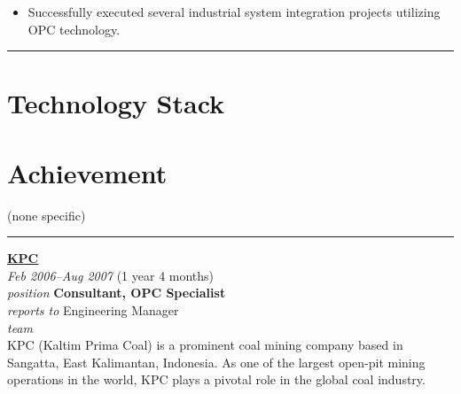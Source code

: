 \documentclass[12pt]{res}
\begin{document}
\begin{resume}
\begin{multicols}{2}
\begin{itemize}
\item Successfully executed several industrial system integration projects utilizing OPC technology.
		\end{itemize}
\end{multicols}

\vspace{-20pt}
\begin{minipage}[t]{0.55\linewidth}
	\rule{0.25\textwidth}{2pt}
	\begin{multicols}{2}
		\section{Technology Stack}
		\columnbreak
		\section{}
	\end{multicols}
	\vspace{1pt}
\end{minipage}
\hfill
\begin{minipage}[t]{0.42\linewidth}
	\vspace{18pt}
	\section{Achievement}
	\begin{flushleft}
        \begin{itemize}
		\footnotesize{(none specific)}
        \end{itemize}
	\end{flushleft}
\end{minipage}

\vspace{10pt}
\rule{1.0\textwidth}{0.1pt}

\begin{multicols}{2}
	{\large {\bf \href{https://kpc.co.id}{KPC}}} \\
	{\footnotesize{\sl Feb 2006--Aug 2007} \hfill (1 year 4 months)}\\
	{\footnotesize{\sl position} \hfill \bf{Consultant, OPC Specialist}}\\
	{\footnotesize{\sl reports to} \hfill Engineering Manager}\\
	{\footnotesize{\sl team} \hfill }\\

	\columnbreak
	{\footnotesize{KPC (Kaltim Prima Coal) is a prominent coal mining company based in Sangatta, East Kalimantan, Indonesia. As one of the largest open-pit mining operations in the world, KPC plays a pivotal role in the global coal industry.}}\\
\end{multicols}
\vspace{-20pt}


\end{resume}
\end{document}
